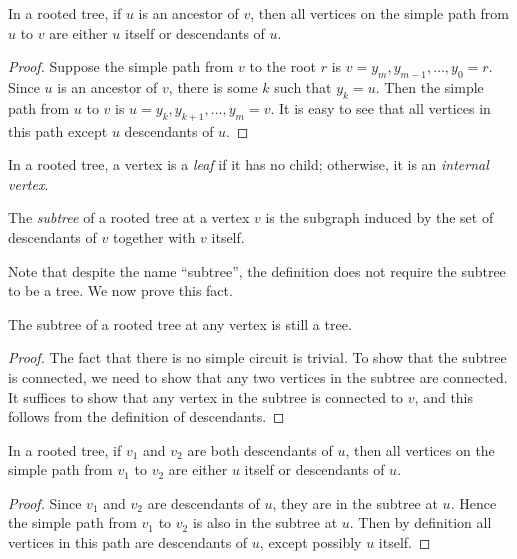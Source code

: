 \begin{lemma}
    In a rooted tree, if $u$ is an ancestor of $v$, then all vertices on the simple path from $u$ to $v$ are either $u$ itself or descendants of $u$.
\end{lemma}

\begin{proof}
    Suppose the simple path from $v$ to the root $r$ is $v=y_m, y_{m-1}, \dots, y_0=r$. Since $u$ is an ancestor of $v$, there is some $k$ such that $y_k=u$. Then the simple path from $u$ to $v$ is $u=y_k, y_{k+1}, \dots, y_m=v$. It is easy to see that all vertices in this path except $u$ descendants of $u$.
\end{proof}

\begin{definition}
    In a rooted tree, a vertex is a \emph{leaf} if it has no child; otherwise, it is an \emph{internal vertex}.
\end{definition}

\begin{definition}[Subtree]
    The \emph{subtree} of a rooted tree at a vertex $v$ is the subgraph induced by the set of descendants of $v$ together with $v$ itself.
\end{definition}

Note that despite the name ``subtree'', the definition does not require the subtree to be a tree. We now prove this fact.

\begin{theorem}
    The subtree of a rooted tree at any vertex is still a tree.
\end{theorem}

\begin{proof}
    The fact that there is no simple circuit is trivial. To show that the subtree is connected, we need to show that any two vertices in the subtree are connected. It suffices to show that any vertex in the subtree is connected to $v$, and this follows from the definition of descendants.
\end{proof}

\begin{theorem}
    In a rooted tree, if $v_1$ and $v_2$ are both descendants of $u$, then all vertices on the simple path from $v_1$ to $v_2$ are either $u$ itself or descendants of $u$.
\end{theorem}

\begin{proof}
    Since $v_1$ and $v_2$ are descendants of $u$, they are in the subtree at $u$. Hence the simple path from $v_1$ to $v_2$ is also in the subtree at $u$. Then by definition all vertices in this path are descendants of $u$, except possibly $u$ itself.
\end{proof}

